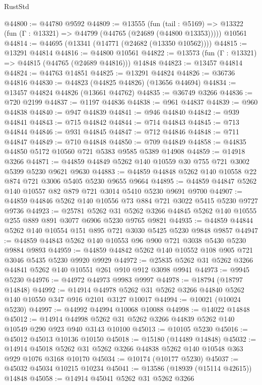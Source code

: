 \begin{lexlean}{RustStd}
\begin{coremodule}
@44800 := @44780 @9592
@44809 := @13555
    (fun (tail : @5169) => @13322 (fun (Γ : @13321) => @44799 (@44765 (@24689 (@44800 @13353)))))
    @10561
@44814 := @44695 (@13341 (@14771 (@24682 (@13350 @10562))))
@44815 := @13291 @44814
@44816 := @44800 @10561
@44822 := @13573 (fun (Γ : @13321) => @44815 (@44765 (@24689 @44816))) @14848
@44823 := @13457 @44814
@44824 := @44763 @14851
@44825 := @13291 @44824
@44826 := @36736 @44816
@44830 := @44823 (@44825 @44826) (@13656 @44694)
@44834 := @13457 @44824 @44826 (@13661 @44762)
@44835 := @36749 @3266
@44836 := @720 @2199
@44837 := @1197 @44836
@44838 := @961 @44837
@44839 := @960 @44838
@44840 := @947 @44839
@44841 := @946 @44840
@44842 := @939 @44841
@44843 := @715 @44842
@44844 := @714 @44843
@44845 := @713 @44844
@44846 := @931 @44845
@44847 := @712 @44846
@44848 := @711 @44847
@44849 := @710 @44848
@44850 := @709 @44849
@44858 := @44835 @44850 @5172 @10560 @721 @5383 @9585 @5389 @14908
@44859 := @14918 @3266
@44871 := @44859 @44849 @5262 @140 @10559 @30 @755 @721 @3002 @5399 @5230 @9621 @9630
@44883 := @44859 @44848 @5262 @140 @10558 @22 @874 @721 @3006 @5405 @5230 @9655 @9664
@44895 := @44859 @44847 @5262 @140 @10557 @82 @879 @721 @3014 @5410 @5230 @9691 @9700
@44907 := @44859 @44846 @5262 @140 @10556 @73 @884 @721 @3022 @5415 @5230 @9727 @9736
@44923 := @25781
    @5262
    @31
    @5262
    @3266
    @44845
    @5262
    @140
    @10555
    @255
    @889
    @891
    @3077
    @6906
    @5230
    @9765
    @9821
@44935 := @44859 @44844 @5262 @140 @10554 @151 @895 @721 @3030 @5425 @5230 @9848 @9857
@44947 := @44859 @44843 @5262 @140 @10553 @96 @900 @721 @3038 @5430 @5230 @9884 @9893
@44959 := @44859 @44842 @5262 @140 @10552 @108 @905 @721 @3046 @5435 @5230 @9920 @9929
@44972 := @25835 @5262 @31 @5262 @3266 @44841 @5262 @140 @10551 @261 @910 @912 @3098 @9941
@44973 := @9945 @5230
@44976 := @44972 @44973 @9983 @9997
@44978 := @18794 (@18797 @14848)
@44992 := @14914 @44978 @5262 @31 @5262 @3266 @44840 @5262 @140 @10550 @347 @916 @2101 @3127 @10017
@44994 := @10021 (@10024 @5230)
@44997 := @44992 @44994 @10068 @10088
@44998 := @14022 @14848
@45012 := @14914 @44998 @5262 @31 @5262 @3266 @44839 @5262 @140 @10549 @290 @923 @940 @3143 @10100
@45013 := @10105 @5230
@45016 := @45012 @45013 @10136 @10150
@45018 := @15180 (@14489 @14848)
@45032 := @14914 @45018 @5262 @31 @5262 @3266 @44838 @5262 @140 @10548 @363 @929 @1076 @3168 @10170
@45034 := @10174 (@10177 @5230)
@45037 := @45032 @45034 @10215 @10234
@45041 := @13586 (@18939 (@15114 @42615)) @14848
@45058 := @14914
    @45041
    @5262
    @31
    @5262
    @3266

\end{coremodule}
\end{lexlean}
